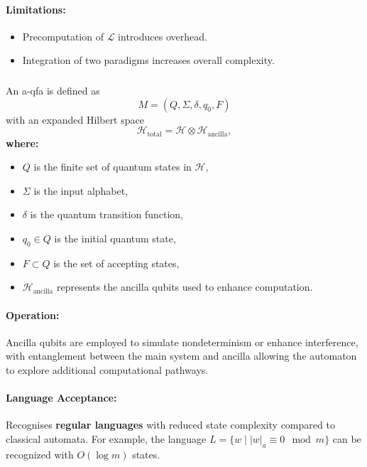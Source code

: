 \paragraph{Limitations:}
\begin{itemize}
    \item Precomputation of \( \mathcal{L} \) introduces overhead.
    \item Integration of two paradigms increases overall complexity.
\end{itemize}

\subsubsection{}
\label{subsec:a-qfa}
\begin{definition}
An \gls{a-qfa} is defined as 
\[
M = (Q, \Sigma, \delta, q_0, F)
\]
with an expanded Hilbert space 
\[
\mathcal{H}_{\text{total}} = \mathcal{H} \otimes \mathcal{H}_{\text{ancilla}},
\]
\textbf{where:}
\begin{itemize}
    \item \( Q \) is the finite set of quantum states in \( \mathcal{H} \),
    \item \( \Sigma \) is the input alphabet,
    \item \( \delta \) is the quantum transition function,
    \item \( q_0 \in Q \) is the initial quantum state,
    \item \( F \subset Q \) is the set of accepting states,
    \item \( \mathcal{H}_{\text{ancilla}} \) represents the ancilla qubits used to enhance computation.
\end{itemize}
\end{definition}

\paragraph{Operation:}  
Ancilla qubits are employed to simulate nondeterminism or enhance interference, with entanglement between the main system and ancilla allowing the automaton to explore additional computational pathways.

\paragraph{Language Acceptance:}  
Recognises \textbf{regular languages} with reduced state complexity compared to classical automata. For example, the language \( L = \{w \mid |w|_a \equiv 0 \mod m\} \) can be recognized with \( O(\log m) \) states.
